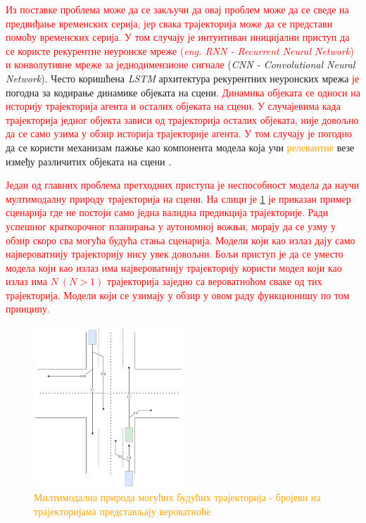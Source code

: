 \documentclass[11pt,oneside]{memoir}
\begin{document}
\textcolor{red}{Из поставке проблема може да се закључи да овај проблем може да се сведе на предвиђање временских серија, јер свака 
трајекторија може да се представи помоћу временских серија. У том случају је интуитиван иницијални приступ да се користе рекурентне неуронске мреже 
(\textit{eng. RNN - Recurrent Neural Network}) и конволутивне мреже за једнодимензионе сигнале} (\textit{CNN - Convolutional Neural Network}). 
Често коришћена \textit{LSTM} архитектура рекурентних неуронских мрежа \textcolor{red}{је} погодна за кодирање динамике објеката на сцени. 
\textcolor{red}{Динамика објеката се односи на историју трајекторија агента и осталих објеката на сцени.} 
\textcolor{red}{У случајевима када трајекторија једног објекта зависи од трајекторија осталих објеката, није довољно да се само узима у обзир
историја трајекторије агента. У том случају је погодно} да се користи механизам пажње као компонента модела која учи 
\textcolor{orange}{релевантне} везе између различитих објеката на сцени \cite{argoverse, social_lstm, attention_is_all_you_need}. 

\textcolor{red}{Један од главних проблема претходних приступа је неспособност модела да научи мултимодалну природу трајекторија на сцени. На слици
је \ref{multimodal-example} је приказан пример сценарија где не постоји само једна валидна предикција трајекторије. 
Ради успешног краткорочног планирања у аутономној вожњи, морају да се узму у обзир скоро сва могућа будућа стања сценарија. Модели
који као излаз дају само највероватнију трајекторију нису увек довољни. Бољи приступ је да се уместо модела који као излаз има највероватнију трајекторију користи
модел који као излаз има $N\ (N > 1)$ трајекторија заједно са вероватноћом сваке од тих трајекторија. Модели који се узимају у обзир у овом раду функционишу
по том принципу. }

\begin{figure}[H]
  \centering
  \includegraphics[width=0.5\textwidth]{images/multimodal.drawio.png}
  \caption{\textcolor{orange}{Милтимодална природа могућих будућих трајекторија - бројеви на трајекторијама представљају вероватноће}}
  \label{multimodal-example}
\end{figure}
\end{document}

